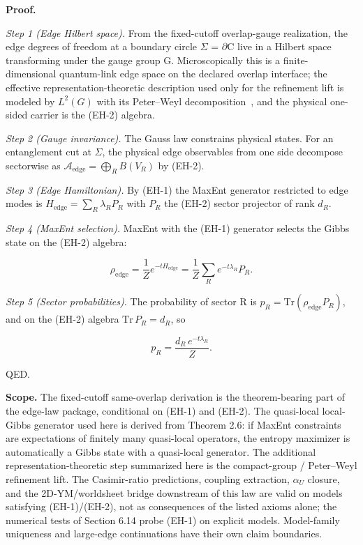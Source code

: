 \textbf{Proof.}

\emph{Step 1 (Edge Hilbert space).} From the fixed-cutoff overlap-gauge realization, the edge
degrees of freedom at a boundary circle \ensuremath{\Sigma} = \ensuremath{\partial}C live in a
Hilbert space transforming under the gauge group G. Microscopically this is a finite-dimensional
quantum-link edge space on the declared overlap interface; the effective
representation-theoretic description used only for the refinement lift is modeled by \(L^2(G)\)
with its Peter--Weyl decomposition~\cite{peterWeyl27}, and the physical one-sided carrier is the
(EH-2) algebra.

\emph{Step 2 (Gauge invariance).} The Gauss law constrains physical states. For an entanglement cut at \ensuremath{\Sigma}, the physical edge observables from one side decompose sectorwise as \(\mathcal A_{\mathrm{edge}} = \bigoplus_R B(V_R)\) by (EH-2).

\emph{Step 3 (Edge Hamiltonian).} By (EH-1) the MaxEnt generator restricted to edge modes is \(H_{\mathrm{edge}} = \sum_R \lambda_R P_R\) with \(P_R\) the (EH-2) sector projector of rank \(d_R\).

\emph{Step 4 (MaxEnt selection).} MaxEnt with the (EH-1) generator selects the Gibbs state on the (EH-2) algebra:

\[
\rho_{\mathrm{edge}} = \frac{1}{Z} e^{-t H_{\mathrm{edge}}} = \frac{1}{Z}
\sum_R e^{-t \lambda_R} P_R.
\]

\emph{Step 5 (Sector probabilities).} The probability of sector R is \(p_R = \mathrm{Tr}(\rho_{\mathrm{edge}} P_R)\), and on the (EH-2) algebra \(\mathrm{Tr}\,P_R = d_R\), so

\[
p_R = \frac{d_R \, e^{-t \lambda_R}}{Z}.
\]

QED.

\textbf{Scope.} The fixed-cutoff same-overlap derivation is the theorem-bearing part of the
edge-law package, conditional on (EH-1) and (EH-2). The quasi-local local-Gibbs
generator used here is derived from Theorem 2.6:
if MaxEnt constraints are expectations of finitely many quasi-local operators, the entropy
maximizer is automatically a Gibbs state with a quasi-local generator. The additional
representation-theoretic step summarized here is the compact-group / Peter--Weyl refinement
lift. The Casimir-ratio predictions, coupling extraction, \(\alpha_U\) closure, and the
2D-YM/worldsheet bridge downstream of this law are valid on models satisfying (EH-1)/(EH-2),
not as consequences of the listed axioms alone; the numerical tests of Section 6.14 probe
(EH-1) on explicit models. Model-family uniqueness and large-edge
continuations have their own claim boundaries.

